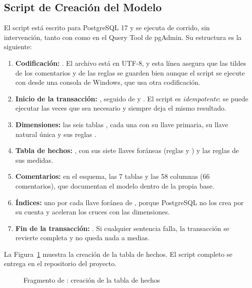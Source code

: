\subsection{Script de Creación del Modelo}

El script  está escrito para PostgreSQL 17 y se ejecuta de
corrido, sin intervención, tanto con  como en el Query Tool de
pgAdmin. Su estructura es la siguiente:

\begin{enumerate}[leftmargin=*]
  \item \textbf{Codificación:} . El archivo
        está en UTF-8, y esta línea asegura que las tildes de los comentarios
        y de las reglas se guarden bien aunque el script se ejecute con
         desde una consola de Windows, que usa otra codificación.
  \item \textbf{Inicio de la transacción:} , seguido de
         y . El
        script es \emph{idempotente}: se puede ejecutar las veces que sea
        necesario y siempre deja el mismo resultado.
  \item \textbf{Dimensiones:} las seis tablas , cada una con su llave
        primaria, su llave natural única y sus reglas .
  \item \textbf{Tabla de hechos:} , con sus siete llaves
        foráneas (reglas  y ) y
        las reglas de sus medidas.
  \item \textbf{Comentarios:}  en el esquema, las 7 tablas y
        las 58 columnas (66 comentarios), que documentan el modelo dentro de la
        propia base.
  \item \textbf{Índices:} uno por cada llave foránea de , porque
        PostgreSQL no los crea por su cuenta y aceleran los cruces con las
        dimensiones.
  \item \textbf{Fin de la transacción:} . Si cualquier sentencia
        falla, la transacción se revierte completa y no queda nada a medias.
\end{enumerate}

La Figura~\ref{fig:ddl_fact} muestra la creación de la tabla de hechos. El
script completo se entrega en el repositorio del proyecto.

\begin{figure}[!htbp]
  \centering
  \caption{Fragmento de : creación de la tabla de hechos }
  \label{fig:ddl_fact}
  \sinunicode{}
\end{figure}

